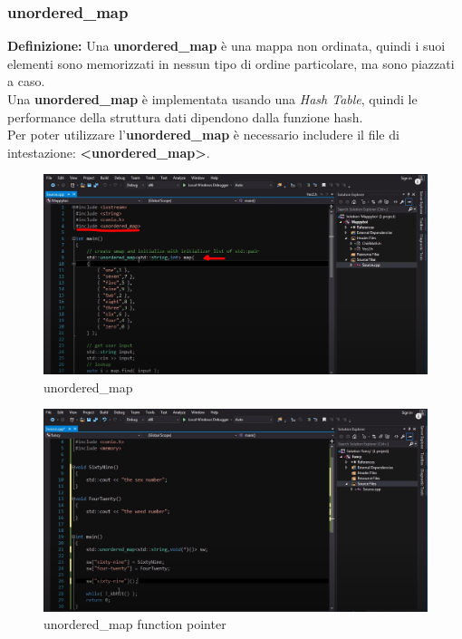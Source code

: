 \subsubsection{unordered\_map} 

\textsf{\small \textbf{Definizione: } Una \textbf{unordered\_map} è una mappa non ordinata, quindi i suoi elementi sono memorizzati in nessun tipo di ordine particolare, ma sono piazzati a caso.} \\

\textsf{\small Una \textbf{unordered\_map} è implementata usando una \emph{Hash Table}, quindi le performance della struttura dati dipendono dalla funzione hash.} \\

\textsf{\small Per poter utilizzare l'\textbf{unordered\_map} è necessario includere il file di intestazione: \textbf{<unordered\_map>}.} \\

\begin{figure}[ht]
	\centering
	\includegraphics[width=1.2\textwidth, height=1.2\textheight, keepaspectratio]{./imgs/unordered_map_include_unordered_map_initialize_it.png}
	\caption{unordered\_map}
	\label{fig:unordered_map_include_unordered_map_initialize_it}
\end{figure}

\begin{figure}[ht]
	\centering
	\includegraphics[width=1.2\textwidth, height=1.2\textheight, keepaspectratio]{./imgs/function_pointers_unordered_map_pointer_to_a_function.png}
	\caption{unordered\_map function pointer}
	\label{fig:function_pointers_unordered_map_pointer_to_a_function}
\end{figure}

